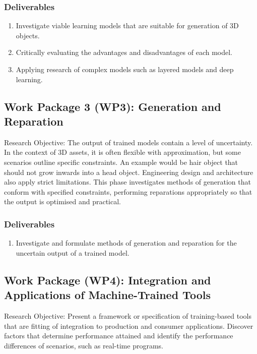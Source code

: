 \documentclass[a4paper, fontsize=15pt, onecolumn]{article} %
\numberwithin{equation}{section} %
\numberwithin{figure}{section} %
\numberwithin{table}{section} %
\begin{document}
\subsubsection{Deliverables} 
\begin{enumerate}
	\item Investigate viable learning models that are suitable for generation of 3D objects.
	\item Critically evaluating the advantages and disadvantages of each model.
	\item Applying research of complex models such as layered models and deep learning.
\end{enumerate}

\subsection{Work Package 3 (WP3): Generation and Reparation}

Research Objective: The output of trained models contain a level of uncertainty. In the context of 3D assets, it is often flexible with approximation, but some scenarios outline specific constraints. An example would be hair object that should not grow inwards into a head object. Engineering design and architecture also apply strict limitations. This phase investigates methods of generation that conform with specified constraints, performing reparations appropriately so that the output is optimised and practical.

\subsubsection{Deliverables}
\begin{enumerate}
	\item Investigate and formulate methods of generation and reparation for the uncertain output of a trained model.
\end{enumerate}

\subsection{Work Package (WP4): Integration and Applications of Machine-Trained Tools}
Research Objective: Present a framework or specification of training-based tools that are fitting of integration to production and consumer applications. Discover factors that determine performance attained and identify the performance differences of scenarios, such as real-time programs.
\end{document}
